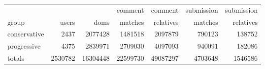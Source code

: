\begin{tabular}{lrrrrrr}
\toprule
& & & comment & comment & submission & submission \\
group & users & doms & matches & relatives & matches & relatives \\
\midrule
 conservative &     2437 &   2077428 &          1481518 &            2097879 &              790123 &                138752 \\
  progressive &     4375 &   2839971 &          2709030 &            4097093 &              940091 &                182086 \\
       totals &  2530782 &  16304448 &         22599730 &           49087297 &             4703648 &               1546586 \\
\bottomrule
\end{tabular}
